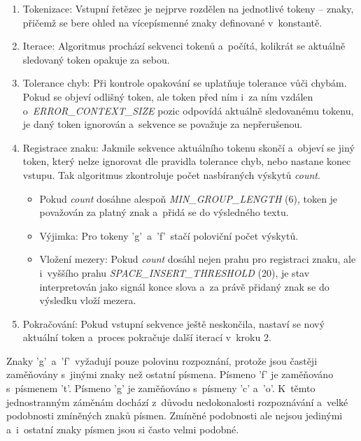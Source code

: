\documentclass[
  master,
  program=ainfvs,
  biblatex,
  figures=true,
  tables=false,
  sourcecodes=true,
  glossaries,
  index
]{kidiplom}
\begin{document}
        \begin{enumerate}
            \item 
            Tokenizace: Vstupní řetězec je nejprve rozdělen na jednotlivé tokeny – znaky, přičemž se bere ohled na vícepísmenné znaky definované v~konstantě.
            
            \item 
            Iterace: Algoritmus prochází sekvenci tokenů a~počítá, kolikrát se aktuálně sledovaný token opakuje za sebou.
           
            \item 
            Tolerance chyb: Při kontrole opakování se uplatňuje tolerance vůči chybám. Pokud se objeví odlišný token, ale token před ním i~za ním vzdálen o~\emph{ERROR\_CONTEXT\_SIZE} pozic odpovídá aktuálně sledovanému tokenu, je daný token ignorován a~sekvence se považuje za nepřerušenou.
           
            \item 
            Registrace znaku: Jakmile sekvence aktuálního tokenu skončí a~objeví se jiný token, který nelze ignorovat dle pravidla tolerance chyb, nebo nastane konec vstupu. Tak algoritmus zkontroluje počet nasbíraných výskytů \emph{count}.
                \begin{itemize}
                    \item 
                        Pokud \emph{count} dosáhne alespoň \emph{MIN\_GROUP\_LENGTH} (6), token je považován za platný znak a~přidá se do výsledného textu.
                     \item 
                        Výjimka: Pro tokeny 'g'~a~'f'~stačí poloviční počet výskytů.
                    \item 
                        Vložení mezery: Pokud \emph{count} dosáhl nejen prahu pro registraci znaku, ale i~vyššího prahu \emph{SPACE\_INSERT\_THRESHOLD} (20), je stav interpretován jako signál konce slova a~za právě přidaný znak se do výsledku vloží mezera.
                \end{itemize}
            
            \item 
            Pokračování: Pokud vstupní sekvence ještě neskončila, nastaví se nový aktuální token a~proces pokračuje další iterací v~kroku 2.
        \end{enumerate}

    Znaky 'g'~a~'f'~vyžadují pouze polovinu rozpoznání, protože jsou častěji zaměňovány s~jinými znaky než ostatní písmena. Písmeno 'f' je zaměňováno s~písmenem 't'. Písmeno 'g' je zaměňováno s~písmeny 'c' a~'o'. K~těmto jednostranným záměnám dochází z~důvodu nedokonalosti rozpoznávání a~velké podobnosti zmíněných znaků písmen. Zmíněné podobnosti ale nejsou jedinými a~i~ostatní znaky písmen jsou si často velmi podobné.
\end{document}
